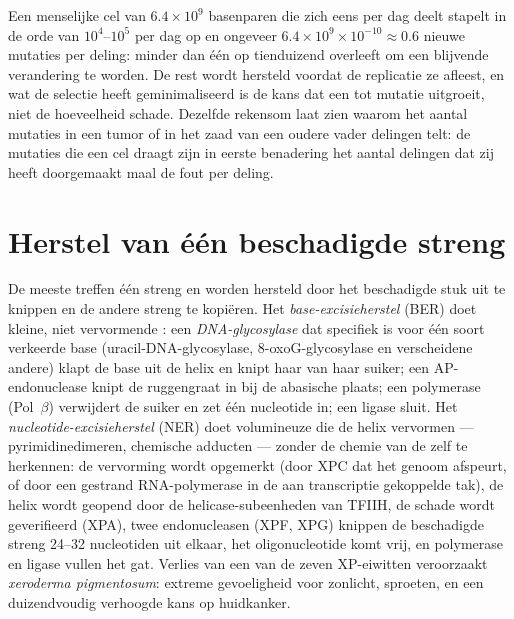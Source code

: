\begin{example}\label{ex:b3:dna-repair:numbers}
Een menselijke cel van $6.4\times 10^{9}$ basenparen die zich eens per
dag deelt stapelt in de orde van $10^{4}$--$10^{5}$  per dag op
en ongeveer $6.4\times 10^{9}\times 10^{-10} \approx 0.6$ nieuwe
mutaties per deling: minder dan één  op tienduizend overleeft om
een blijvende verandering te worden. De rest wordt hersteld voordat de
replicatie ze afleest, en wat de selectie heeft geminimaliseerd is de
kans dat een  tot mutatie uitgroeit, niet de hoeveelheid schade.
Dezelfde rekensom laat zien waarom het aantal mutaties in een tumor of
in het zaad van een oudere vader delingen telt: de mutaties die een cel
draagt zijn in eerste benadering het aantal delingen dat zij heeft
doorgemaakt maal de fout per deling.
\end{example}

\section{Herstel van één beschadigde streng}

\begin{definition}[Excisieherstel]\label{def:b3:dna-repair:excision}
De meeste  treffen één streng en worden hersteld door het
beschadigde stuk uit te knippen en de andere streng te kopiëren. Het
\emph{base-excisieherstel} (BER) doet kleine, niet vervormende
: een \emph{DNA-glycosylase} dat specifiek is voor één soort
verkeerde base (uracil-DNA-glycosylase, 8-oxoG-glycosylase en
verscheidene andere) klapt de base uit de helix en knipt haar van haar
suiker; een AP-endonuclease knipt de ruggengraat in bij de abasische
plaats; een polymerase (Pol~$\beta$) verwijdert de suiker en zet één
nucleotide in; een ligase sluit. Het \emph{nucleotide-excisieherstel}
(NER) doet volumineuze  die de helix vervormen ---
pyrimidinedimeren, chemische adducten --- zonder de chemie van de
 zelf te herkennen: de vervorming wordt opgemerkt (door XPC dat
het genoom afspeurt, of door een gestrand RNA-polymerase in de aan
transcriptie gekoppelde tak), de helix wordt geopend door de
helicase-subeenheden van TFIIH, de schade wordt geverifieerd (XPA),
twee endonucleasen (XPF, XPG) knippen de beschadigde streng
\numrange{24}{32} nucleotiden uit elkaar, het oligonucleotide komt
vrij, en polymerase en ligase vullen het gat. Verlies van een van de
zeven XP-eiwitten veroorzaakt \emph{xeroderma pigmentosum}: extreme
gevoeligheid voor zonlicht, sproeten, en een duizendvoudig verhoogde
kans op huidkanker.
\end{definition}

